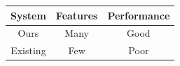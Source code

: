 \begin{table}[t]
    \centering
    
    \begin{tabular}{c|c|c}
        \hline \hline
            \textbf{System} &
            Features &
            Performance \\
        \hline \hline
            Ours &
            Many &
            Good \\
        \hline
            Existing &
            Few &
            Poor \\
        \hline \hline
    \end{tabular}

    
    \label{tab:research-one:some-table}
\end{table}
